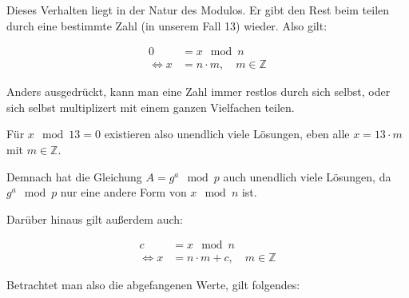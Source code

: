 \documentclass[12pt,twocolumn]{report}
\begin{document}
\begin{center}
\end{center}

\begin{flushleft}
Dieses Verhalten liegt in der Natur des Modulos.
Er gibt den Rest beim teilen durch eine bestimmte Zahl
(in unserem Fall 13) wieder.
Also gilt:
\end{flushleft}

\begin{align}   
    0&=x\mod n \\
    \Leftrightarrow x&=n\cdot m,\quad m\in\mathbb{Z}
\end{align}

\begin{flushleft}
Anders ausgedrückt, kann man eine Zahl immer restlos durch sich
selbst, oder sich selbst multiplizert mit einem ganzen Vielfachen teilen.

Für $x\mod 13=0$ existieren also unendlich viele Lösungen,
eben alle $x=13\cdot m$ mit $m\in\mathbb{Z}$.

Demnach hat die Gleichung $A=g^a\mod p$ auch unendlich viele Lösungen,
da $g^a\mod p$ nur eine andere Form von $x\mod n$ ist.

Darüber hinaus gilt außerdem auch:
\end{flushleft}

\begin{align}
    c&=x\mod n \\
    \Leftrightarrow x&=n\cdot m+c,\quad m\in\mathbb{Z}
\end{align}

\begin{flushleft}
Betrachtet man also die abgefangenen Werte, gilt folgendes:
\end{flushleft}
\end{document}
